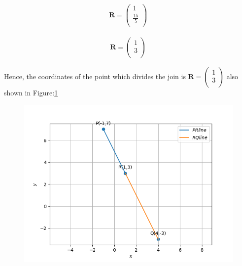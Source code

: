 \documentclass[12pt]{article}
\newcommand{\myvec}[1]{\ensuremath{\begin{pmatrix}#1\end{pmatrix}}}
\let\vec\mathbf
\begin{document}
\begin{align}
\vec{R}=\myvec{
1\\
	\frac{15}{5}\\
}
\end{align}


\begin{align}
 \vec{R}=\myvec{
        1\\
        3\\
  }
  \end{align}




Hence, the coordinates of the point which divides the join is $\vec{R}=\myvec{1\\3\\}$ also shown in Figure:\ref{fig:Fig}


\begin{figure}[!h]
\begin{center}
   \includegraphics[width=\columnwidth]{./figs/linefig.png}
\end{center}
\caption{}
\label{fig:Fig}
\end{figure}
\end{document}
